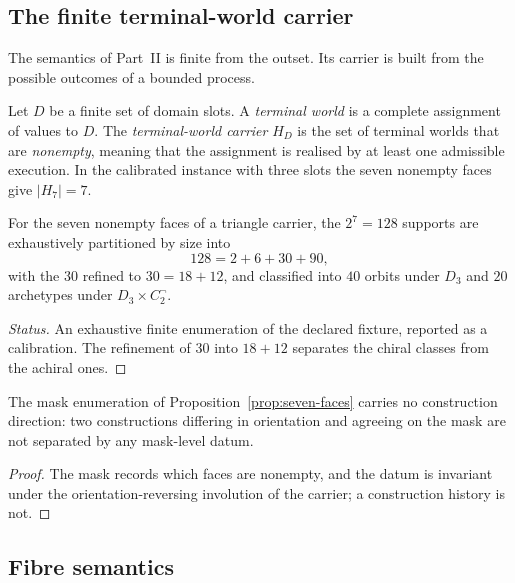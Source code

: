 \subsection{The finite terminal-world carrier}

The semantics of Part~II is finite from the outset.  Its carrier is built from the
possible outcomes of a bounded process.

\begin{definition}\label{def:terminal-worlds}
Let $D$ be a finite set of domain slots.  A \emph{terminal world} is a complete assignment
of values to $D$.  The \emph{terminal-world carrier} $H_D$ is the set of terminal worlds
that are \emph{nonempty}, meaning that the assignment is realised by at least one
admissible execution.  In the calibrated instance with three slots the seven nonempty
faces give $|H_7|=7$.
\end{definition}

\begin{proposition}\label{prop:seven-faces}
For the seven nonempty faces of a triangle carrier, the $2^{7}=128$ supports are
exhaustively partitioned by size into
\[
  128=2+6+30+90 ,
\]
with the $30$ refined to $30=18+12$, and classified into $40$ orbits under $D_3$ and
$20$ archetypes under $D_3\times C_2^{\neg}$.
\end{proposition}

\begin{proof}[Status]
An exhaustive finite enumeration of the declared fixture, reported as a calibration.  The
refinement of $30$ into $18+12$ separates the chiral classes from the achiral ones.
\end{proof}

\begin{nogo}\label{nogo:mask-direction}
The mask enumeration of Proposition~\ref{prop:seven-faces} carries no construction
direction: two constructions differing in orientation and agreeing on the mask are not
separated by any mask-level datum.
\end{nogo}

\begin{proof}
The mask records which faces are nonempty, and the datum is invariant under the
orientation-reversing involution of the carrier; a construction history is not.
\end{proof}

\subsection{Fibre semantics}

